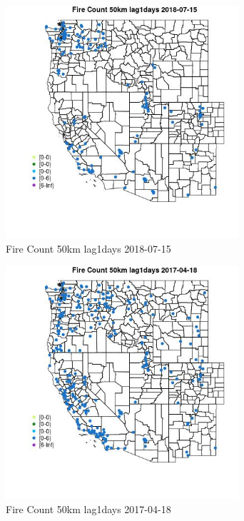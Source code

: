 \begin{figure} 
\centering  
\includegraphics[width=0.77\textwidth]{Code_Outputs/Report_ML_input_PM25_Step4_part_e_de_duplicated_aves_compiled_2019-05-20wNAs_MapObsFire_Count_50km_lag1days2018-07-15.jpg} 
\caption{\label{fig:Report_ML_input_PM25_Step4_part_e_de_duplicated_aves_compiled_2019-05-20wNAsMapObsFire_Count_50km_lag1days2018-07-15}Fire Count 50km lag1days 2018-07-15} 
\end{figure} 
 

\begin{figure} 
\centering  
\includegraphics[width=0.77\textwidth]{Code_Outputs/Report_ML_input_PM25_Step4_part_e_de_duplicated_aves_compiled_2019-05-20wNAs_MapObsFire_Count_50km_lag1days2017-04-18.jpg} 
\caption{\label{fig:Report_ML_input_PM25_Step4_part_e_de_duplicated_aves_compiled_2019-05-20wNAsMapObsFire_Count_50km_lag1days2017-04-18}Fire Count 50km lag1days 2017-04-18} 
\end{figure} 
 

